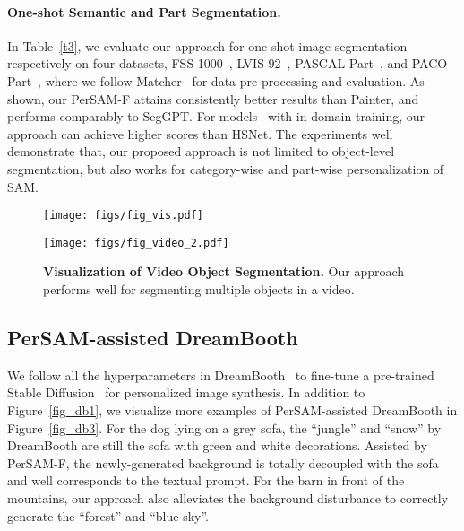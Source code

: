 \documentclass{article} \usepackage{iclr2024_conference,times}
\makeatletter
\newcommand\figcaption{\def\@captype{figure}\caption}
\makeatother
\begin{document}
\paragraph{One-shot Semantic and Part Segmentation.}
In Table~\ref{t3}, we evaluate our approach for one-shot image segmentation respectively on four datasets, FSS-1000~\citep{li2020fss}, LVIS-92~\citep{gupta2019lvis}, PASCAL-Part~\citep{morabia2020attention}, and PACO-Part~\citep{ramanathan2023paco}, where we follow Matcher~\citep{liu2023matcher} for data pre-processing and evaluation. As shown, our PerSAM-F attains consistently better results than Painter, and performs comparably to SegGPT. For models~\citep{min2021hypercorrelation,hong2022cost} with in-domain training, our approach can achieve higher scores than HSNet. The experiments well demonstrate that, our proposed approach is not limited to object-level segmentation, but also works for category-wise and part-wise personalization of SAM.

\begin{figure*}[t!]
\vspace{-0.2cm}
\begin{minipage}[t]{0.47\textwidth}
\texttt{[image: figs/fig\_vis.pdf]}
\figcaption{\textbf{Visualization of PerSAM-F's Improvement.} Our scale-aware fine-tuning can well alleviate the scale ambiguity of PerSAM.}
\label{fig_vis}
\end{minipage}
\hspace{0.24in}
\vspace{-0.2cm}
\begin{minipage}[t]{0.47\textwidth}
\texttt{[image: figs/fig\_video\_2.pdf]}
\figcaption{\textbf{Visualization of Video Object Segmentation.} Our approach performs well for segmenting multiple objects in a video.}
\label{fig_video}
\end{minipage}
\end{figure*}



\subsection{PerSAM-assisted DreamBooth}
\label{s4.3}

We follow all the hyperparameters in DreamBooth~\citep{ruiz2022dreambooth} to fine-tune a pre-trained Stable Diffusion~\citep{rombach2022high} for personalized image synthesis.
In addition to Figure~\ref{fig_db1}, we visualize more examples of PerSAM-assisted DreamBooth in Figure~\ref{fig_db3}. For the dog lying on a grey sofa, the ``jungle'' and ``snow'' by DreamBooth are still the sofa with green and white decorations. Assisted by PerSAM-F, the newly-generated background is totally decoupled with the sofa and well corresponds to the textual prompt. For the barn in front of the mountains, our approach also alleviates the background disturbance to correctly generate the ``forest'' and ``blue sky''.
\end{document}
